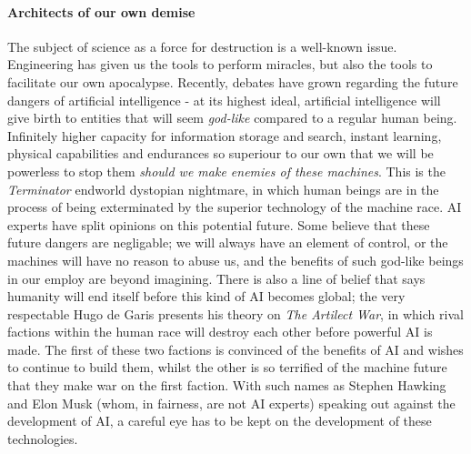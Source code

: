 \paragraph{Architects of our own demise}
The subject of science as a force for destruction is a well-known issue. Engineering has given us the tools to perform miracles, but also the tools to facilitate our own apocalypse. Recently, debates have grown regarding the future dangers of artificial intelligence - at its highest ideal, artificial intelligence will give birth to entities that will seem \emph{god-like} compared to a regular human being. Infinitely higher capacity for information storage and search, instant learning, physical capabilities and endurances so superiour to our own that we will be powerless to stop them \emph{should we make enemies of these machines}. This is the \emph{Terminator} endworld dystopian nightmare, in which human beings are in the process of being exterminated by the superior technology of the machine race. 
AI experts have split opinions on this potential future. Some believe that these future dangers are negligable; we will always have an element of control, or the machines will have no reason to abuse us, and the benefits of such god-like beings in our employ are beyond imagining. There is also a line of belief that says humanity will end itself before this kind of AI becomes global; the very respectable Hugo de Garis presents his theory on \emph{The Artilect War}\cite{artilect}, in which rival factions within the human race will destroy each other before powerful AI is made. The first of these two factions is convinced of the benefits of AI and wishes to continue to build them, whilst the other is so terrified of the machine future that they make war on the first faction. With such names as Stephen Hawking and Elon Musk (whom, in fairness, are not AI experts) speaking out against the development of AI, a careful eye has to be kept on the development of these technologies. 